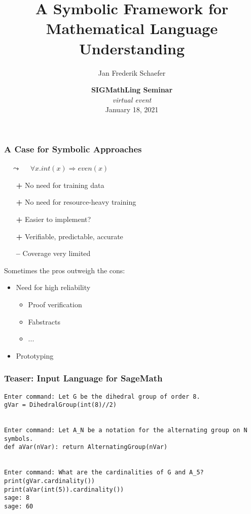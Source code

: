 \documentclass[aspectratio=169]{beamer}
\title{A Symbolic Framework for Mathematical Language Understanding}
\author{Jan Frederik Schaefer}
\institute{FAU Erlangen-N\"urnberg}
\date{\textbf{SIGMathLing Seminar} \\ \textit{virtual event} \\ January 18, 2021 }
\begin{document}
\frame\titlepage

\begin{frame}
    \frametitle{A Case for Symbolic Approaches}
    {
        \centering
         $\quad\leadsto\quad$ {\color{logicfg}$\forall x.int(x) \Rightarrow even(x)$}\par
    }

    \vspace{1.5em}
    \begin{itemize}
        \item[\textbf{+}] No need for training data
        \item[\textbf{+}] No need for resource-heavy training
        \item[\textbf{+}] Easier to implement?
        \item[\textbf{+}] Verifiable, predictable, accurate
        \item[\textbf{--\hspace{0.15em}}] Coverage very limited
    \end{itemize}

    \vspace{1.5em}
    Sometimes the pros outweigh the cons:
    \begin{itemize}
        \item Need for high reliability
            \begin{itemize}
                \item Proof verification
                \item Fabstracts
                \item ...
            \end{itemize}
        \item Prototyping
    \end{itemize}
\end{frame}

\begin{frame}[fragile]
    \frametitle{Teaser: Input Language for SageMath}
    \begin{lstlisting}
Enter command: Let G be the dihedral group of order 8.
gVar = DihedralGroup(int(8)//2)


Enter command: Let A_N be a notation for the alternating group on N symbols.
def aVar(nVar): return AlternatingGroup(nVar)


Enter command: What are the cardinalities of G and A_5?
print(gVar.cardinality())
print(aVar(int(5)).cardinality())
sage: 8
sage: 60
    \end{lstlisting}
\end{frame}
\end{document}
